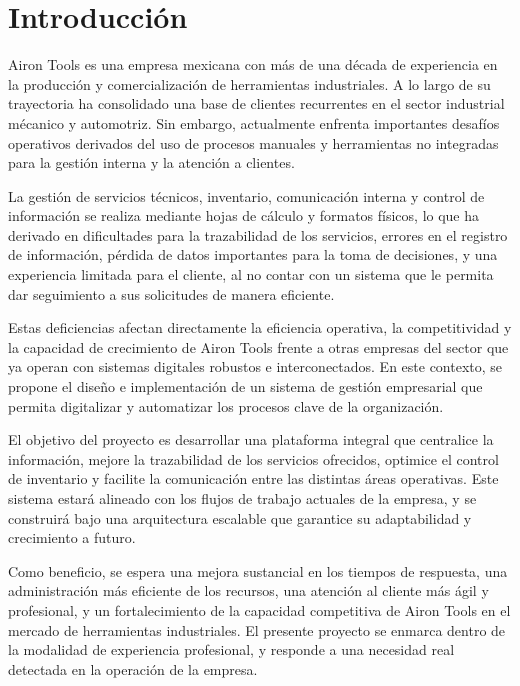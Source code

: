 \pagestyle{fancy}
\section{Introducción}

Airon Tools es una empresa mexicana con más de una década de experiencia en la producción y comercialización de herramientas industriales. A lo largo de su trayectoria ha consolidado una base de clientes recurrentes en el sector industrial mécanico y automotriz. Sin embargo, actualmente enfrenta importantes desafíos operativos derivados del uso de procesos manuales y herramientas no integradas para la gestión interna y la atención a clientes.

La gestión de servicios técnicos, inventario, comunicación interna y control de información se realiza mediante hojas de cálculo y formatos físicos, lo que ha derivado en dificultades para la trazabilidad de los servicios, errores en el registro de información, pérdida de datos importantes para la toma de decisiones, y una experiencia limitada para el cliente, al no contar con un sistema que le permita dar seguimiento a sus solicitudes de manera eficiente.

Estas deficiencias afectan directamente la eficiencia operativa, la competitividad y la capacidad de crecimiento de Airon Tools frente a otras empresas del sector que ya operan con sistemas digitales robustos e interconectados. En este contexto, se propone el diseño e implementación de un sistema de gestión empresarial que permita digitalizar y automatizar los procesos clave de la organización.

El objetivo del proyecto es desarrollar una plataforma integral que centralice la información, mejore la trazabilidad de los servicios ofrecidos, optimice el control de inventario y facilite la comunicación entre las distintas áreas operativas. Este sistema estará alineado con los flujos de trabajo actuales de la empresa, y se construirá bajo una arquitectura escalable que garantice su adaptabilidad y crecimiento a futuro.

Como beneficio, se espera una mejora sustancial en los tiempos de respuesta, una administración más eficiente de los recursos, una atención al cliente más ágil y profesional, y un fortalecimiento de la capacidad competitiva de Airon Tools en el mercado de herramientas industriales. El presente proyecto se enmarca dentro de la modalidad de experiencia profesional, y responde a una necesidad real detectada en la operación de la empresa.

